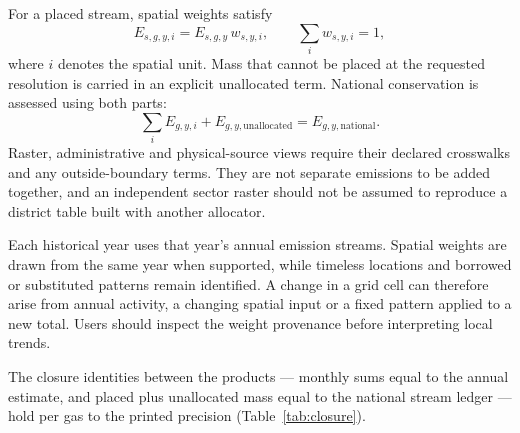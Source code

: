 \documentclass[essd]{copernicus}
\begin{document}
For a placed stream, spatial weights satisfy
\begin{equation}
 E_{s,g,y,i}=E_{s,g,y}\,w_{s,y,i},\qquad
 \sum_i w_{s,y,i}=1,
 \label{eq:spatial}
\end{equation}
where $i$ denotes the spatial unit. Mass that cannot be placed at the requested resolution is carried in an explicit unallocated term. National conservation is assessed using both parts:
\begin{equation}
 \sum_i E_{g,y,i}+E_{g,y,\mathrm{unallocated}}
 =E_{g,y,\mathrm{national}}.
 \label{eq:spatial_closure}
\end{equation}
Raster, administrative and physical-source views require their declared crosswalks and any outside-boundary terms. They are not separate emissions to be added together, and an independent sector raster should not be assumed to reproduce a district table built with another allocator.

Each historical year uses that year's annual emission streams. Spatial weights are drawn from the same year when supported, while timeless locations and borrowed or substituted patterns remain identified. A change in a grid cell can therefore arise from annual activity, a changing spatial input or a fixed pattern applied to a new total. Users should inspect the weight provenance before interpreting local trends.

The closure identities between the products --- monthly sums equal to the annual estimate, and placed plus unallocated mass equal to the national stream ledger --- hold per gas to the printed precision (Table~\ref{tab:closure}).

\end{document}
